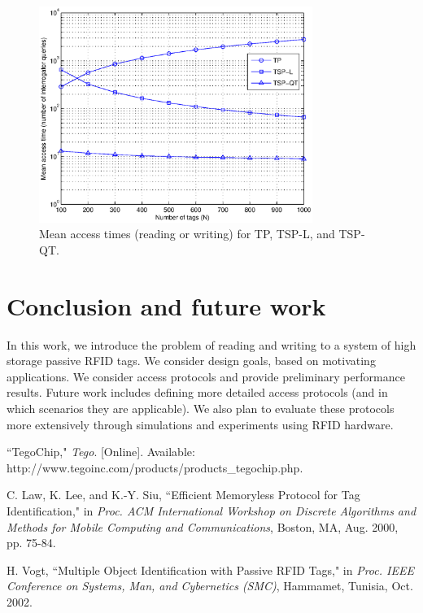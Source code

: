 \documentclass[conference]{IEEEtran}
\begin{document}
\begin{figure}
\centering
\includegraphics[width=3.5in]{access_time.eps}
\caption{Mean access times (reading or writing) for TP, TSP-L, and TSP-QT. \label{fig:access_time}}
\end{figure}

\section{Conclusion and future work}
In this work, we introduce the problem of reading and writing to a system of high storage passive RFID tags.  We consider design goals, based on motivating applications.  We consider access protocols and provide preliminary performance results.  Future work includes defining more detailed access protocols (and in which scenarios they are applicable).  We also plan to evaluate these protocols more extensively through simulations and experiments using RFID hardware.

\begin{thebibliography}{1}

``TegoChip," \emph{Tego}. [Online]. Available: http://www.tegoinc.com/products/products\_tegochip.php.

C. Law, K. Lee, and K.-Y. Siu, ``Efficient Memoryless Protocol for Tag Identification," in \emph{Proc. ACM International Workshop on Discrete Algorithms and Methods for Mobile Computing and Communications}, Boston, MA, Aug. 2000, pp. 75-84.

H. Vogt, ``Multiple Object Identification with Passive RFID Tags," in \emph{Proc. IEEE Conference on Systems, Man, and Cybernetics (SMC)}, Hammamet, Tunisia, Oct. 2002.


\end{thebibliography}
\end{document}
